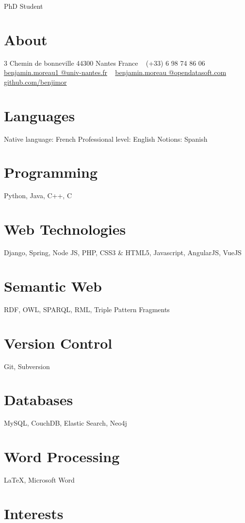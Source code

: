 \documentclass[]{friggeri-cv}
\begin{document}
       {PhD Student}


\begin{aside}
  \section{About}
    3 Chemin de bonneville
    44300 Nantes
    France
    ~
    (+33) 6 98 74 86 06
    ~
    \href{mailto:benjamin.moreau1@univ-nantes.fr}{benjamin.moreau1
    @univ-nantes.fr}
    ~
    \href{mailto:benjamin.moreau@opendatasoft.com}{benjamin.moreau
    @opendatasoft.com}
    ~
    \href{https://github.com/benjimor}{github.com/benjimor}
  \section{Languages}
    Native language: French
    Professional level: English
    Notions: Spanish
  \section{Programming}
  	Python, Java, C++, C
  \section{Web Technologies}
 	Django, Spring, Node JS, 
 	PHP, CSS3 \& HTML5,
 	Javascript,
 	AngularJS, VueJS
  \section{Semantic Web}
  	RDF, OWL, SPARQL, RML,
  	Triple Pattern Fragments
  \section{Version Control}
  	Git, Subversion
  \section{Databases}
  	MySQL, CouchDB,
  	Elastic Search, Neo4j
  \section{Word Processing}
  	\LaTeX, Microsoft Word
\end{aside}

\section{Interests}
\end{document}

